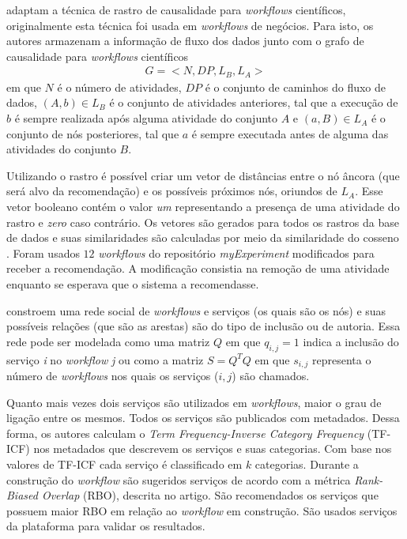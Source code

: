  adaptam a técnica de rastro de causalidade para \emph{workflows} científicos, originalmente esta técnica foi usada em \emph{workflows} de negócios. Para isto, os autores armazenam a informação de fluxo dos dados junto com o grafo de causalidade para \emph{workflows} científicos 
\begin{align}
G = <N, DP, L_{B}, L_{A}>
\end{align}
em que \(N\) é o número de atividades, \(DP\) é o conjunto de caminhos do fluxo de dados, \((A, b) \in L_{B}\) é o conjunto de atividades anteriores, tal que a execução de \(b\) é sempre realizada após alguma atividade do conjunto \(A\) e \((a, B) \in L_{A}\) é o conjunto de nós posteriores, tal que \(a\) é sempre executada antes de alguma das atividades do conjunto \(B\).

Utilizando o rastro é possível criar um vetor de distâncias entre o nó âncora (que será alvo da recomendação) e os possíveis próximos nós, oriundos de \(L_{A}\). Esse vetor booleano contém o valor \emph{um} representando a presença de uma atividade do rastro e \emph{zero} caso contrário. Os vetores são gerados para todos os rastros da base de dados e suas similaridades são calculadas por meio da similaridade do cosseno \cite{Deza2009}. Foram usados \(12\) \emph{workflows} do repositório \emph{myExperiment} \cite{ROURE2015} modificados para receber a recomendação. A modificação consistia na remoção de uma atividade enquanto se esperava que o sistema a recomendasse.

 constroem uma rede social de \emph{workflows} e serviços (os quais são os nós) e suas possíveis relações (que são as arestas) são do tipo de inclusão ou de autoria. Essa rede pode ser modelada como uma matriz \(Q\) em que \(q_{i, j} = 1\) indica a inclusão do serviço \emph{i} no \emph{workflow} \emph{j} ou como a matriz \(S = Q^{T}Q\) em que \(s_{i, j}\) representa o número de \emph{workflows} nos quais os serviços (\(i, j\)) são chamados. 

Quanto mais vezes dois serviços são utilizados em \emph{workflows}, maior o grau de ligação entre os mesmos. Todos os serviços são publicados com metadados. Dessa forma, os autores calculam o \emph{Term Frequency-Inverse Category Frequency} (TF-ICF) nos metadados que descrevem os serviços e suas categorias. Com base nos valores de TF-ICF cada serviço é classificado em \(k\) categorias. Durante a construção do \emph{workflow} são sugeridos serviços de acordo com a métrica \emph{Rank-Biased Overlap} (RBO), descrita no artigo. São recomendados os serviços que possuem maior RBO em relação ao \emph{workflow} em construção. São usados serviços da plataforma  para validar os resultados.

